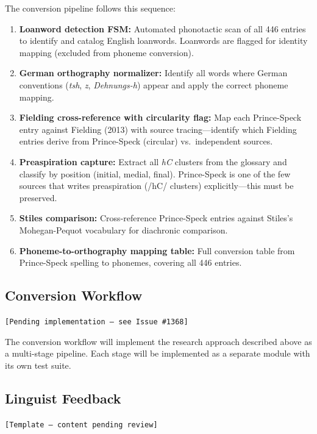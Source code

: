 The conversion pipeline follows this sequence:

\begin{enumerate}
  \item \textbf{Loanword detection FSM:} Automated phonotactic scan of all
    446 entries to identify and catalog English loanwords. Loanwords are
    flagged for identity mapping (excluded from phoneme conversion).
  \item \textbf{German orthography normalizer:} Identify all words where
    German conventions (\textit{tsh}, \textit{z}, \textit{Dehnungs-h})
    appear and apply the correct phoneme mapping.
  \item \textbf{Fielding cross-reference with circularity flag:} Map each
    Prince-Speck entry against Fielding (2013) with source tracing---identify
    which Fielding entries derive from Prince-Speck (circular) vs.\
    independent sources.
  \item \textbf{Preaspiration capture:} Extract all \textit{hC} clusters
    from the glossary and classify by position (initial, medial, final).
    Prince-Speck is one of the few sources that writes preaspiration
    (/hC/ clusters) explicitly---this must be preserved.
  \item \textbf{Stiles comparison:} Cross-reference Prince-Speck entries
    against Stiles's Mohegan-Pequot vocabulary for diachronic comparison.
  \item \textbf{Phoneme-to-orthography mapping table:} Full conversion table
    from Prince-Speck spelling to phonemes, covering all 446 entries.
\end{enumerate}

\subsection{Conversion Workflow}
\label{sec:1368-workflow}

\texttt{[Pending implementation --- see Issue \#1368]}

The conversion workflow will implement the research approach described above
as a multi-stage pipeline. Each stage will be implemented as a separate
module with its own test suite.

\subsection{Linguist Feedback}
\label{sec:1368-feedback}

\texttt{[Template --- content pending review]}

